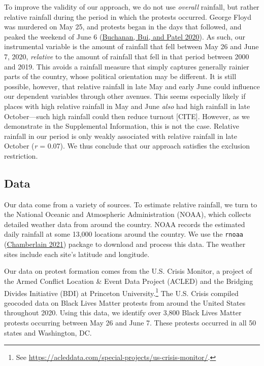 \documentclass[
  12pt,
]{article}
\begin{document}
To improve the validity of our approach, we do not use \emph{overall} rainfall, but rather relative rainfall during the period in which the protests occurred. George Floyd was murdered on May 25, and protests began in the days that followed, and peaked the weekend of June 6 (\protect\hyperlink{ref-Buchanan2020}{Buchanan, Bui, and Patel 2020}). As such, our instrumental variable is the amount of rainfall that fell between May 26 and June 7, 2020, \emph{relative} to the amount of rainfall that fell in that period between 2000 and 2019. This avoids a rainfall measure that simply captures generally rainier parts of the country, whose political orientation may be different. It is still possible, however, that relative rainfall in late May and early June could influence our dependent variables through other avenues. This seems especially likely if places with high relative rainfall in May and June \emph{also} had high rainfall in late October---such high rainfall could then reduce turnout {[}CITE{]}. However, as we demonstrate in the Supplemental Information, this is not the case. Relative rainfall in our period is only weakly associated with relative rainfall in late October (\emph{r} = 0.07). We thus conclude that our approach satisfies the exclusion restriction.

\hypertarget{data}{%
\subsection*{Data}\label{data}}

Our data come from a variety of sources. To estimate relative rainfall, we turn to the National Oceanic and Atmospheric Administration (NOAA), which collects detailed weather data from around the country. NOAA records the estimated daily rainfall at some 13,000 locations around the country. We use the \texttt{rnoaa} (\protect\hyperlink{ref-Chamberlain2021}{Chamberlain 2021}) package to download and process this data. The weather sites include each site's latitude and longitude.

Our data on protest formation comes from the U.S. Crisis Monitor, a project of the Armed Conflict Location \& Event Data Project (ACLED) and the Bridging Divides Initiative (BDI) at Princeton University.\footnote{See \url{https://acleddata.com/special-projects/us-crisis-monitor/}.} The U.S. Crisis compiled geocoded data on Black Lives Matter protests from around the United States throughout 2020. Using this data, we identify over 3,800 Black Lives Matter protests occurring between May 26 and June 7. These protests occurred in all 50 states and Washington, DC.
\end{document}
